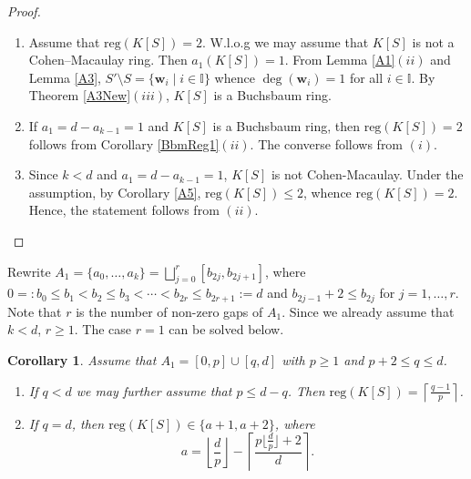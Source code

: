 \documentclass[11pt]{article}
\newtheorem{Corollary}[Theorem]{Corollary}
\def\deg{\operatorname{deg}}
\def\reg{\mathrm{reg}}
\def\wbf{{\mathbf w}}
\def\Iset{{\mathbb I}}
\theoremstyle{remark}
\theoremstyle{definition}
\begin{document}
\begin{proof} 
\begin{enumerate}[\((i)\)]
    \item Assume that $\reg(K[S]) = 2$. W.l.o.g we may assume that $K[S]$ is not a Cohen--Macaulay ring. Then $a_1(K[S]) = 1$. From Lemma \ref{A1}\((ii)\) and  Lemma \ref{A3}, $S'\setminus S = \{\wbf_i\mid i\in \Iset\}$ whence $\deg(\wbf_i) = 1$ for all $i\in \Iset$. By Theorem \ref{A3New}\((iii)\),  $K[S]$ is a Buchsbaum ring.
    \item If $a_1 = d-a_{k-1} = 1$ and $K[S]$ is a Buchsbaum ring, then $\reg(K[S]) = 2$ follows from Corollary 
\ref{BbmReg1}\((ii)\). The converse follows from \((i)\).
\item Since $k<d$ and $a_1 = d-a_{k-1} = 1$, $K[S]$   is not Cohen-Macaulay. Under the assumption, by Corollary \ref{A5}, $\reg(K[S]) \leq 2$, whence $\reg(K[S]) = 2$.  Hence, the statement follows from \((ii)\).
\end{enumerate}
\end{proof}

Rewrite $ A_1 = \{a_0,\ldots,a_k\} = \bigsqcup_{j=0}^r [b_{2j},b_{2j+1}]$, where $0=:b_0 \leq b_1 < b_2 \leq b_3 < \cdots < b_{2r}\leq b_{2r+1} := d$ and $b_{2j-1} + 2 \leq b_{2j}$ for $j=1,\ldots,r$. Note that $r$ is the number of non-zero gaps of $A_1$. Since we already assume that $k<d$, $r\geq 1$. The case $r=1$ can be solved below. 

\begin{Corollary} \label{R1}  Assume that $A_1 = [0,p] \cup [q,d]$ with $p\geq 1$ and $p+2\leq q\leq d$.
\begin{enumerate}[\((i)\)]
    \item If $q<d$ we may further  assume that $p \leq  d-q$. Then $\reg(K[S]) =\left\lceil \frac{q-1}{p} \right\rceil$.
    \item If $q = d$, then $\reg(K[S]) \in \{a+1, a+2\}$, where 
$$a = \left\lfloor \frac{d}{p} \right\rfloor - \left\lceil \frac{p\lfloor \frac{d}{p} \rfloor + 2}{d} \right\rceil.$$
\end{enumerate}
\end{Corollary}
\end{document}
